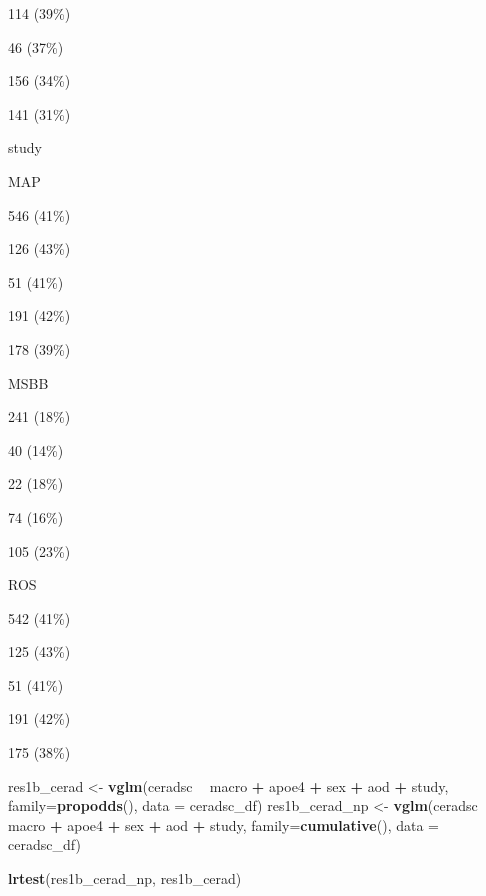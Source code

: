 \documentclass[]{book}
\newenvironment{Shaded}{\begin{snugshade}}{\end{snugshade}}
\newcommand{\DataTypeTok}[1]{\textcolor[rgb]{0.13,0.29,0.53}{#1}}
\newcommand{\KeywordTok}[1]{\textcolor[rgb]{0.13,0.29,0.53}{\textbf{#1}}}
\newcommand{\NormalTok}[1]{#1}
\newcommand{\OperatorTok}[1]{\textcolor[rgb]{0.81,0.36,0.00}{\textbf{#1}}}
\newcommand{\StringTok}[1]{\textcolor[rgb]{0.31,0.60,0.02}{#1}}
\begin{document}
114 (39\%)

46 (37\%)

156 (34\%)

141 (31\%)

study

MAP

546 (41\%)

126 (43\%)

51 (41\%)

191 (42\%)

178 (39\%)

MSBB

241 (18\%)

40 (14\%)

22 (18\%)

74 (16\%)

105 (23\%)

ROS

542 (41\%)

125 (43\%)

51 (41\%)

191 (42\%)

175 (38\%)

\begin{Shaded}
\end{Shaded}

\begin{Shaded}
\begin{Highlighting}[]
\NormalTok{res1b_cerad <-}\StringTok{ }\KeywordTok{vglm}\NormalTok{(ceradsc }\OperatorTok{~}\StringTok{ }\NormalTok{macro }\OperatorTok{+}\StringTok{ }\NormalTok{apoe4 }\OperatorTok{+}\StringTok{ }\NormalTok{sex }\OperatorTok{+}\StringTok{ }\NormalTok{aod }\OperatorTok{+}\StringTok{ }\NormalTok{study, }
                  \DataTypeTok{family=}\KeywordTok{propodds}\NormalTok{(), }\DataTypeTok{data =}\NormalTok{ ceradsc_df)}
\NormalTok{res1b_cerad_np <-}\StringTok{ }\KeywordTok{vglm}\NormalTok{(ceradsc }\OperatorTok{~}\StringTok{ }\NormalTok{macro }\OperatorTok{+}\StringTok{ }\NormalTok{apoe4 }\OperatorTok{+}\StringTok{ }\NormalTok{sex }\OperatorTok{+}\StringTok{ }\NormalTok{aod }\OperatorTok{+}\StringTok{ }\NormalTok{study, }
                     \DataTypeTok{family=}\KeywordTok{cumulative}\NormalTok{(), }\DataTypeTok{data =}\NormalTok{ ceradsc_df)}

\KeywordTok{lrtest}\NormalTok{(res1b_cerad_np, res1b_cerad)}
\end{Highlighting}
\end{Shaded}
\end{document}
